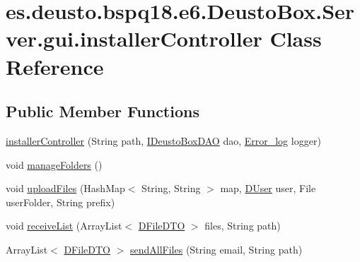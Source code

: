 \hypertarget{classes_1_1deusto_1_1bspq18_1_1e6_1_1_deusto_box_1_1_server_1_1gui_1_1installer_controller}{}\section{es.\+deusto.\+bspq18.\+e6.\+Deusto\+Box.\+Server.\+gui.\+installer\+Controller Class Reference}
\label{classes_1_1deusto_1_1bspq18_1_1e6_1_1_deusto_box_1_1_server_1_1gui_1_1installer_controller}
\subsection*{Public Member Functions}
\begin{DoxyCompactItemize}
\item 
\mbox{\hyperlink{classes_1_1deusto_1_1bspq18_1_1e6_1_1_deusto_box_1_1_server_1_1gui_1_1installer_controller_adc047f0cf500b7499338248187a5343f}{installer\+Controller}} (String path, \mbox{\hyperlink{interfacees_1_1deusto_1_1bspq18_1_1e6_1_1_deusto_box_1_1_server_1_1jdo_1_1dao_1_1_i_deusto_box_d_a_o}{I\+Deusto\+Box\+D\+AO}} dao, \mbox{\hyperlink{classes_1_1deusto_1_1bspq18_1_1e6_1_1_deusto_box_1_1_server_1_1utils_1_1_error__log}{Error\+\_\+log}} logger)
\item 
void \mbox{\hyperlink{classes_1_1deusto_1_1bspq18_1_1e6_1_1_deusto_box_1_1_server_1_1gui_1_1installer_controller_ac8bb835094be4d93b197d7ce4a141640}{manage\+Folders}} ()
\item 
void \mbox{\hyperlink{classes_1_1deusto_1_1bspq18_1_1e6_1_1_deusto_box_1_1_server_1_1gui_1_1installer_controller_a6cb55b3da1b623735e609f2597139659}{upload\+Files}} (Hash\+Map$<$ String, String $>$ map, \mbox{\hyperlink{classes_1_1deusto_1_1bspq18_1_1e6_1_1_deusto_box_1_1_server_1_1jdo_1_1data_1_1_d_user}{D\+User}} user, File user\+Folder, String prefix)
\item 
void \mbox{\hyperlink{classes_1_1deusto_1_1bspq18_1_1e6_1_1_deusto_box_1_1_server_1_1gui_1_1installer_controller_a0b4f20de9ac0e488360307822ee34092}{receive\+List}} (Array\+List$<$ \mbox{\hyperlink{classes_1_1deusto_1_1bspq18_1_1e6_1_1_deusto_box_1_1_server_1_1dto_1_1_d_file_d_t_o}{D\+File\+D\+TO}} $>$ files, String path)
\item 
Array\+List$<$ \mbox{\hyperlink{classes_1_1deusto_1_1bspq18_1_1e6_1_1_deusto_box_1_1_server_1_1dto_1_1_d_file_d_t_o}{D\+File\+D\+TO}} $>$ \mbox{\hyperlink{classes_1_1deusto_1_1bspq18_1_1e6_1_1_deusto_box_1_1_server_1_1gui_1_1installer_controller_afc7cd731e02e09a5fca73d970b91b547}{send\+All\+Files}} (String email, String path)

\end{DoxyCompactItemize}
